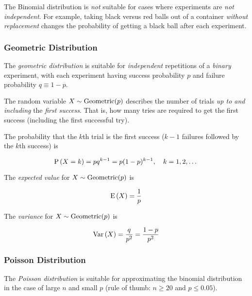 \begin{remark}
    The Binomial distribution is \textit{not} suitable for cases where experiments are \textit{not independent}. For example, taking black versus red balls out of a container \textit{without replacement} changes the probability of getting a black ball after each experiment.
\end{remark}

\subsubsection{Geometric Distribution}

\begin{definition}
    The \textit{geometric distribution} is suitable for \textit{independent} repetitions of a \textit{binary} experiment, with each experiment having success probability $p$ and failure probability $q \equiv 1 - p$.
    
    The random variable $X \sim \mathrm{Geometric}(p)$ describes the number of trials \textit{up to and including} the \textit{first success}. That is, how many tries are required to get the first success (including the first successful try).
    
    The probability that the $k$th trial is the first success ($k - 1$ failures followed by the $k$th success) is
    
    \begin{equation}
        \mathrm{P} \left( X = k \right) = pq^{k - 1} = p(1-p)^{k-1}, \quad k = 1, 2, \dots
    \end{equation}
    
    The \textit{expected value} for $X \sim \mathrm{Geometric}(p)$ is
    
    \begin{equation}
        \mathrm{E} \left( X \right) = \frac{1}{p}
    \end{equation}
    
    The \textit{variance} for $X \sim \mathrm{Geometric}(p)$ is
    
    \begin{equation}
        \mathrm{Var} \left( X \right) = \frac{q}{p^2} = \frac{1 - p}{p^2}
    \end{equation}
\end{definition}

\subsubsection{Poisson Distribution}

\begin{remark}
    The \textit{Poisson distribution} is suitable for approximating the binomial distribution in the case of large $n$ and small $p$ (rule of thumb: $n \ge 20$ and $p \le 0.05$).
\end{remark}

